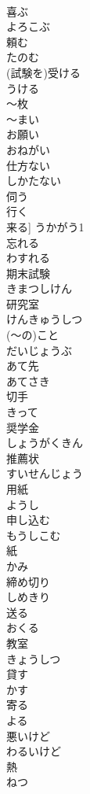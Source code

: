 \documentclass[8pt]{extreport}
\begin{document}
\begin{CJK}{UTF8}{min}
\\	喜ぶ	
\\	よろこぶ
\\	頼む	
\\	たのむ
\\	(試験を)受ける	
\\	うける
\\	～枚	
\\	～まい
\\	お願い	
\\	おねがい
\\	仕方ない	
\\	しかたない
\\	伺う	
\\	行く 
\\	来る]	うかがう1
\\	忘れる	
\\	わすれる
\\	期末試験	
\\	きまつしけん
\\	研究室	
\\	けんきゅうしつ
\\	(～の)こと	
\\	だいじょうぶ	
\\	あて先	
\\	あてさき
\\	切手	
\\	きって
\\	奨学金	
\\	しょうがくきん
\\	推薦状	
\\	すいせんじょう
\\	用紙	
\\	ようし
\\	申し込む	
\\	もうしこむ
\\	紙	
\\	かみ
\\	締め切り	
\\	しめきり
\\	送る	
\\	おくる
\\	教室	
\\	きょうしつ
\\	貸す	
\\	かす
\\	寄る	
\\	よる
\\	悪いけど	
\\	わるいけど
\\	熱	
\\	ねつ

\end{CJK}
\end{document}
